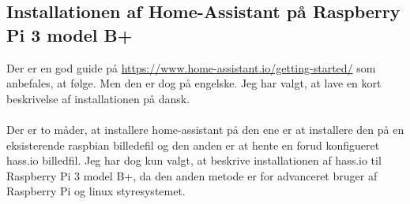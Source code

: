 \subsection{Installationen af Home-Assistant på Raspberry Pi 3 model B+}
Der er en god guide på \url{https://www.home-assistant.io/getting-started/} som anbefales, at følge.
Men den er dog på engelske. Jeg har valgt, at lave en kort beskrivelse af installationen på dansk.
\\
\\
Der er to måder, at installere home-assistant på den ene er at installere den på en eksisterende raspbian billedefil og den anden er at hente en forud konfigueret hass.io billedfil.
Jeg har dog kun valgt, at beskrive installationen af hass.io til Raspberry Pi 3 model B+, da den anden metode er for advanceret bruger af Raspberry Pi og linux styresystemet.
